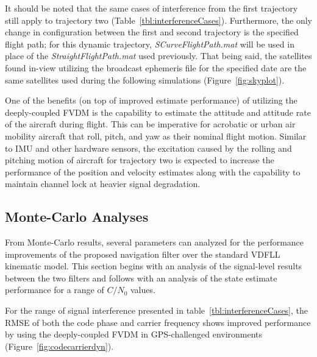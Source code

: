 It should be noted that the same cases of interference from the first trajectory still apply to trajectory two (Table~\ref{tbl:interferenceCases}). Furthermore, the only change in configuration between the first and second trajectory is the specified flight path; for this dynamic trajectory, \textit{SCurveFlightPath.mat} will be used in place of the \textit{StraightFlightPath.mat} used previously. That being said, the satellites found in-view utilizing the broadcast ephemeris file for the specified date are the same satellites used during the following simulations (Figure~\ref{fig:skyplot}).

One of the benefits (on top of improved estimate performance) of utilizing the deeply-coupled FVDM is the capability to estimate the attitude and attitude rate of the aircraft during flight. This can be imperative for acrobatic or urban air mobility aircraft that roll, pitch, and yaw as their nominal flight motion. Similar to IMU and other hardware sensors, the excitation caused by the rolling and pitching motion of aircraft for trajectory two is expected to increase the performance of the position and velocity estimates along with the capability to maintain channel lock at heavier signal degradation.

\subsection{\textbf{Monte-Carlo Analyses}}
From Monte-Carlo results, several parameters can analyzed for the performance improvements of the proposed navigation filter over the standard VDFLL kinematic model. This section begins with an analysis of the signal-level results between the two filters and follows with an analysis of the state estimate performance for a range of \(C/N_0\) values.

For the range of signal interference presented in table~\ref{tbl:interferenceCases}, the RMSE of both the code phase and carrier frequency shows improved performance by using the deeply-coupled FVDM in GPS-challenged environments (Figure~\ref{fig:codecarrierdyn}).

